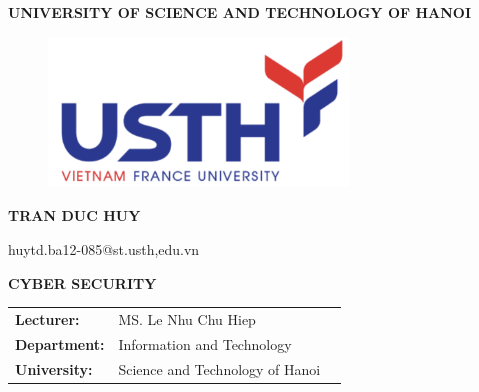 \documentclass{article}
\begin{document}
\begin{center}
    \vspace{12pt} %
        \textbf{\fontsize{15pt}{0pt} \selectfont{} UNIVERSITY OF SCIENCE AND TECHNOLOGY OF HANOI}
    \vspace{0.5cm}

\begin{figure}[H]
    \centering
    \includegraphics[width=8cm, height=4cm]{Logo/usth.png}
\end{figure}

\vspace{48pt}
\vspace{24pt}

\vspace{18pt}

        \fontsize{14pt}{0pt}\selectfont{} \textbf{TRAN DUC HUY}
    \vspace{3pt}

        \fontsize{14pt}{0pt}\selectfont{} huytd.ba12-085@st.usth,edu.vn
    \vspace{12pt} %

        \fontsize{14pt}{0pt}\selectfont{} \textbf{CYBER SECURITY} 

\end{center}
    \vspace{48pt}

\begin{table}[H]
    \centering
        \begin{tabular}{l l c}
            \textbf{Lecturer:}    &  MS. Le Nhu Chu Hiep \vspace{6pt} &  \\
            \textbf{Department:} & Information and Technology \vspace{3pt}\\ 
            \textbf{University:} & Science and Technology of Hanoi
        \end{tabular}
\end{table}
\end{document}
